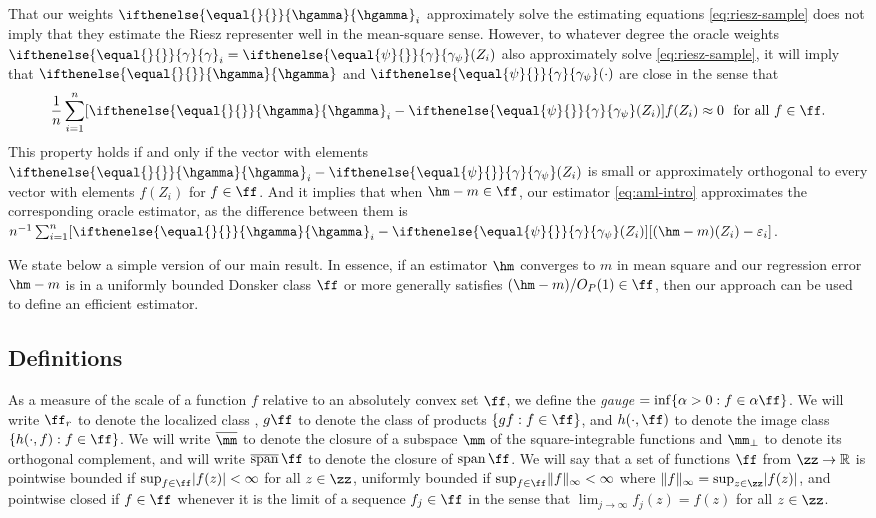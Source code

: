 \documentclass[aos,submission]{imsart}
\theoremstyle{plain}
\theoremstyle{remark}
\DeclareMathOperator*{\vspan}{span}
\DeclareMathOperator*{\cspan}{\overline{span}}
\newcommand{\riesz}[1][]{\ifthenelse{\equal{#1}{}}{\gamma}{\gamma_{{#1}}}}
\newcommand{\hriesz}[1][]{\ifthenelse{\equal{#1}{}}{\hgamma}{\hgamma_{{#1}}}}
\DeclarePairedDelimiter\abs{\lvert}{\rvert}
\DeclarePairedDelimiter\norm{\lVert}{\rVert}
\DeclarePairedDelimiter\set{\{}{\}}
\newcommand{\R}{\mathbb{R}}
\begin{document}
That our weights $\hriesz_i$ approximately solve the estimating equations \eqref{eq:riesz-sample}
does not imply that they estimate the Riesz representer \smash{$\riesz[\psi](\cdot)$} well in the mean-square
sense. 
However, to whatever degree the oracle weights $\riesz_i = \riesz[\psi](Z_i)$ also approximately solve 
\eqref{eq:riesz-sample}, it will imply that $\hriesz$ and $\riesz[\psi](\cdot)$ are close in the sense that
\begin{equation}
\label{eq:bilin-uniform}
\frac{1}{n}\sum_{i=1}^n [\hriesz_i-\riesz[\psi](Z_i)]f(Z_i) \approx 0 \ \text{ for all}\ f \in \ff.
\end{equation}
This property holds if and only if the vector with elements $\hriesz_i - \riesz[\psi](Z_i)$ is small or 
approximately orthogonal to every vector with elements $f(Z_i)$ for $f \in \ff$. 
And it implies that when $\hm - m \in \ff$, our estimator \eqref{eq:aml-intro} approximates the corresponding
oracle estimator, as the difference between them is $n^{-1}\sum_{i=1}^n [\hriesz_i-\riesz[\psi](Z_i)][(\hm-m)(Z_i) - \varepsilon_i]$. 

We state below a simple version of our main result. In essence, 
if an estimator $\hm$ converges to $m$ in mean square and our regression error $\hm - m$ is in a uniformly bounded Donsker class $\ff$ 
or more generally satisfies $(\hm - m)/O_P(1) \in \ff$, then our approach can be used to define an efficient estimator.

\subsection{Definitions}

As a measure of the scale of a function $f$ relative to an absolutely convex set $\ff$, 
we define the \emph{gauge}  $= \inf\set{\alpha > 0 : f \in \alpha\ff}$.
We will write $\ff_r$ to denote the localized class ,
$g\ff$ to denote the class of products $\set{ gf : f \in \ff}$, and
$h(\cdot, \ff)$ to denote the image class $\set{ h(\cdot, f) : f \in \ff}$.
We will write $\overline{\mm}$ to denote the closure of a subspace $\mm$ of the square-integrable functions
and $\mm_{\perp}$ to denote its orthogonal complement, and will write $\cspan \ff$ to denote the closure of $\vspan \ff$.
We will say that a set of functions $\ff$ from $\zz \to \R$ is pointwise bounded if $\sup_{f \in \ff} \abs{f(z)} < \infty$ for all $z \in \zz$,
uniformly bounded if $\sup_{f \in \ff}\norm{f}_{\infty} < \infty$ where $\norm{f}_{\infty}=\sup_{z \in \zz}\abs{f(z)}$, 
and pointwise closed if $f \in \ff$ whenever it is the limit of a sequence $f_j \in \ff$ in the sense that $\lim_{j \to \infty} f_j(z)=f(z)$ for all $z \in \zz$.
\end{document}
